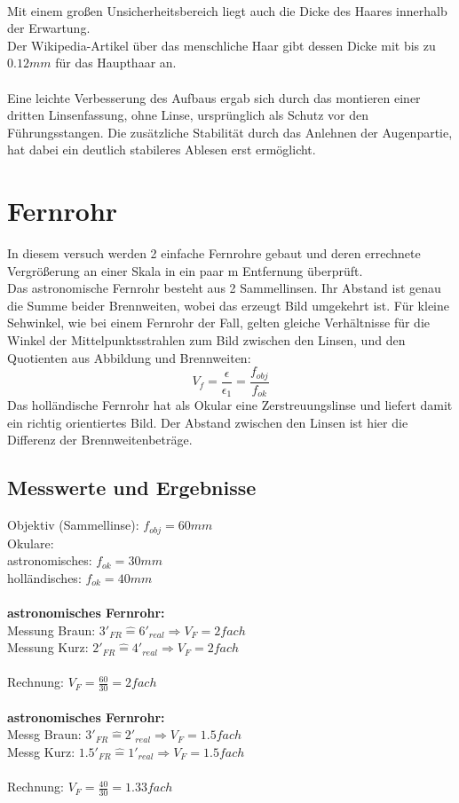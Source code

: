 \documentclass[12pt,a4paper]{article}
\begin{document}
\begin{multicols}{2}
\\
Mit einem großen Unsicherheitsbereich liegt auch die Dicke des Haares innerhalb der Erwartung.\\
Der Wikipedia-Artikel über das menschliche Haar gibt dessen Dicke mit bis zu $0.12mm$ für das Haupthaar an.\\
\\
Eine leichte Verbesserung des Aufbaus ergab sich durch das montieren einer dritten Linsenfassung, ohne Linse, ursprünglich als Schutz vor den Führungsstangen. Die zusätzliche Stabilität durch das Anlehnen der Augenpartie, hat dabei ein deutlich stabileres Ablesen erst ermöglicht.

\section{Fernrohr}
In diesem versuch werden 2 einfache Fernrohre gebaut und deren errechnete Vergrößerung an einer Skala in ein paar m Entfernung überprüft.\\
Das astronomische Fernrohr besteht aus 2 Sammellinsen. Ihr Abstand ist genau die Summe beider Brennweiten, wobei das erzeugt Bild umgekehrt ist. Für kleine Sehwinkel, wie bei einem Fernrohr der Fall, gelten gleiche Verhältnisse für die Winkel der Mittelpunktsstrahlen zum Bild zwischen den Linsen, und den Quotienten aus Abbildung und Brennweiten:
$$V_f=\frac{\epsilon}{\epsilon_1}=\frac{f_{obj}}{f_{ok}}$$
Das holländische Fernrohr hat als Okular eine Zerstreuungslinse und liefert damit ein richtig orientiertes Bild. Der Abstand zwischen den Linsen ist hier die Differenz der Brennweitenbeträge.

\subsection{Messwerte und Ergebnisse}
Objektiv (Sammellinse): $f_{obj}=60mm$\\
Okulare:\\
astronomisches: $f_{ok}=30mm$\\
holländisches: $f_{ok}=40mm$\\
\\
\textbf{astronomisches Fernrohr:}\\
Messung Braun: $3'_{FR} \widehat{=} 6'_{real}\Rightarrow V_F=2 fach$\\
Messung Kurz: $2'_{FR} \widehat{=} 4'_{real}\Rightarrow V_F=2 fach$\\
\\
Rechnung: $V_F = \frac{60}{30}=2fach$\\
\\
\textbf{astronomisches Fernrohr:}\\
Messg Braun: $3'_{FR} \widehat{=} 2'_{real}\Rightarrow V_F=1.5fach$\\
Messg Kurz: $1.5'_{FR} \widehat{=} 1'_{real}\Rightarrow V_F=1.5fach$\\
\\
Rechnung: $V_F = \frac{40}{30}=1.33fach$\\





\end{multicols}
\end{document}
